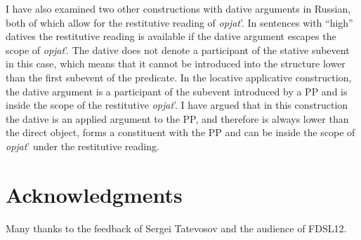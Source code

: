 \documentclass[output=paper,modfonts,nonflat,
 hidelinks
]{langsci/langscibook}
\begin{document}
I have also examined two other constructions with dative arguments in Russian, both of which allow for the restitutive reading of \textit{opjat}’. In sentences with “high” datives the restitutive reading is available if the dative argument escapes the scope of \textit{opjat}’. The dative does not denote a participant of the stative subevent in this case, which means that it cannot be introduced into the structure lower than the first subevent of the predicate. In the locative applicative construction, the dative argument is a participant of the subevent introduced by a PP and is inside the scope of the restitutive \textit{opjat}’. I have argued that in this construction the dative is an applied argument to the PP, and therefore is always lower than the direct object, forms a constituent with the PP and can be inside the scope of \textit{opjat}’ under the restitutive reading.


\section*{Acknowledgments}
Many thanks to the feedback of Sergei Tatevosov and the audience of FDSL12.
\end{document}
